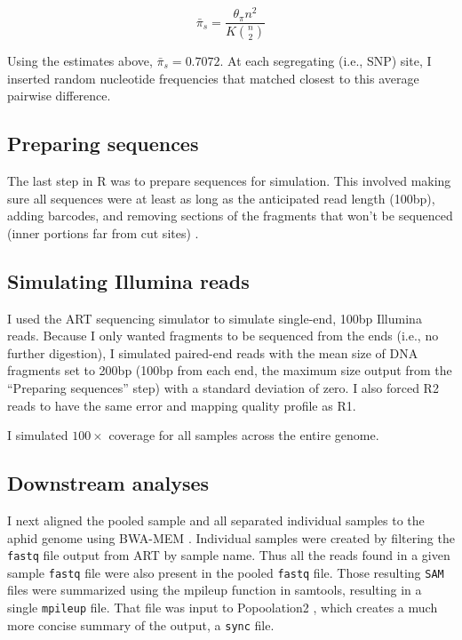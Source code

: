 \begin{equation} \label{eq:barpi_s}
    \bar{\pi}_{s} = \frac{\theta_\pi n^2}{K {n \choose 2}}
\end{equation}

Using the estimates above, $\bar{\pi}_s = 0.7072$. At each segregating (i.e., SNP) site,
I inserted random nucleotide frequencies that matched closest to this average pairwise
difference.

\subsection{Preparing sequences}

The last step in R was to prepare sequences for simulation.
This involved making sure all sequences were at least as long as the anticipated read 
length (100bp), adding barcodes, and removing sections of the fragments that won't be 
sequenced (inner portions far from cut sites) \citep{Elshire:2011gn,Davey:2011ip}.

\subsection{Simulating Illumina reads}

I used the ART sequencing simulator \citep{Huang:2012kq} to simulate single-end, 100bp
Illumina reads.
Because I only wanted fragments to be sequenced from the ends (i.e., no further 
digestion), I simulated paired-end reads with the mean size of DNA fragments set to
200bp (100bp from each end, the maximum size output from the ``Preparing sequences''
step) with a standard deviation of zero.
I also forced R2 reads to have the same error and mapping quality profile as R1.

I simulated $100\times$ coverage for all samples across the entire genome.


\subsection{Downstream analyses}

I next aligned the pooled sample and all separated individual samples to the aphid genome
using BWA-MEM \citep{Li:2013wn}. 
Individual samples were created by filtering the \texttt{fastq} file output from ART
by sample name. Thus all the reads found in a given sample \texttt{fastq} file were also
present in the pooled \texttt{fastq} file.
Those resulting \texttt{SAM} files were summarized using the mpileup function in 
samtools, resulting in a single \texttt{mpileup} file.
That file was input to Popoolation2 \citep{Kofler:2011ds}, which creates a much more 
concise summary of the output, a \texttt{sync} file.


